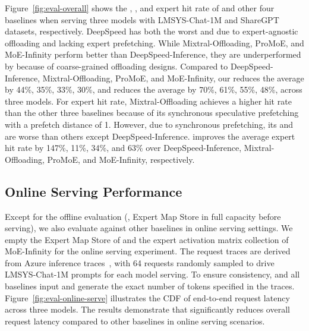Figure~\ref{fig:eval-overall} shows the \TTFT, \TPOT, and expert hit rate of \sys and other four baselines when serving three \MoE models with LMSYS-Chat-1M and ShareGPT datasets, respectively.
DeepSpeed has both the worst \TTFT and \TPOT due to expert-agnostic offloading and lacking expert prefetching.
While Mixtral-Offloading, ProMoE, and MoE-Infinity perform better than DeepSpeed-Inference, they are underperformed by \sys because of coarse-grained offloading designs.
Compared to DeepSpeed-Inference, Mixtral-Offloading, ProMoE, and MoE-Infinity, our \sys reduces the average \TTFT by 44\%, 35\%, 33\%, 30\%, and reduces the average \TPOT by 70\%, 61\%, 55\%, 48\%, across three \MoE models.
%
For expert hit rate, Mixtral-Offloading achieves a higher hit rate than the other three baselines because of its synchronous speculative prefetching with a prefetch distance of 1. However, due to synchronous prefetching, its \TTFT and \TPOT are worse than others except DeepSpeed-Inference.
\sys improves the average expert hit rate by 147\%, 11\%, 34\%, and 63\% over DeepSpeed-Inference, Mixtral-Offloading, ProMoE, and MoE-Infinity, respectively.





\subsection{Online Serving Performance}
\label{subsec:eval-online}


Except for the offline evaluation (\ie, Expert Map Store in full capacity before serving), we also evaluate \sys against other baselines in online serving settings.
We empty the Expert Map Store of \sys and the expert activation matrix collection of MoE-Infinity for the online serving experiment.
%
The request traces are derived from Azure \LLM inference traces~\cite{patel2024splitwise,stojkovic2025dynamollm}, with 64 requests randomly sampled to drive LMSYS-Chat-1M prompts for each \MoE model serving. 
To ensure consistency, \sys and all baselines input and generate the exact number of tokens specified in the traces.
%
Figure~\ref{fig:eval-online-serve} illustrates the CDF of end-to-end request latency across three \MoE models. The results demonstrate that \sys significantly reduces overall request latency compared to other baselines in online serving scenarios.


